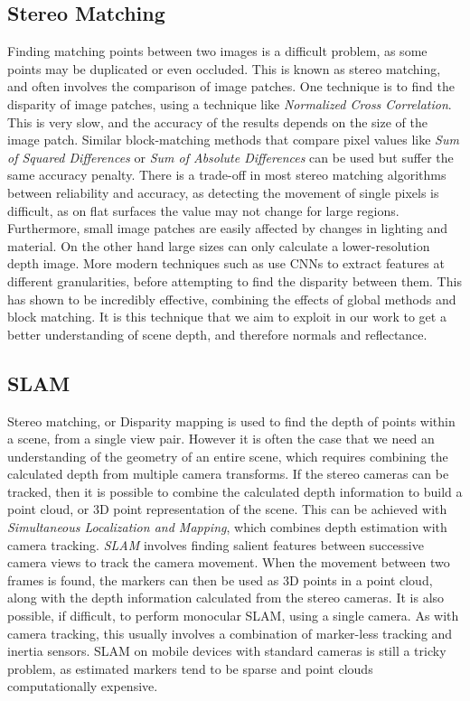 \documentclass[ %
                    author={Gavin Parker},
                supervisor={Dr. Neill Campbell},
                    degree={MEng},
                     title={Deep Learning for Illumination Estimation from Stereo Images},
                  subtitle={},
                      type={Research},
                      year={2018} ]{dissertation}
\begin{document}
\subsection{Stereo Matching}
Finding matching points between two images is a difficult problem, as some points may be duplicated or even occluded. This is known as stereo matching, and often involves the comparison of image patches. One technique is to find the disparity of image patches, using a technique like \textit{Normalized Cross Correlation}. This is very slow, and the accuracy of the results depends on the size of the image patch. Similar block-matching methods that compare pixel values like \textit{Sum of Squared Differences} or \textit{Sum of Absolute Differences} can be used but suffer the same accuracy penalty. There is a trade-off in most stereo matching algorithms between reliability and accuracy, as detecting the movement of single pixels is difficult, as on flat surfaces the value may not change for large regions. Furthermore, small image patches are easily affected by changes in lighting and material. On the other hand large sizes can only calculate a lower-resolution depth image. More modern techniques such as \cite{7780983} use CNNs to extract features at different granularities, before attempting to find the disparity between them. This has shown to be incredibly effective, combining the effects of global methods and block matching. It is this technique that we aim to exploit in our work to get a better understanding of scene depth, and therefore normals and reflectance.
\subsection{SLAM}
Stereo matching, or Disparity mapping is used to find the depth of points within a scene, from a single view pair. However it is often the case that we need an understanding of the geometry of an entire scene, which requires combining the calculated depth from multiple camera transforms. If the stereo cameras can be tracked, then it is possible to combine the calculated depth information to build a point cloud, or 3D point representation of the scene. This can be achieved with \textit{Simultaneous Localization and Mapping}, which combines depth estimation with camera tracking. \textit{SLAM} involves finding salient features between successive camera views to track the camera movement. When the movement between two frames is found, the markers can then be used as 3D points in a point cloud, along with the depth information calculated from the stereo cameras. It is also possible, if difficult, to perform monocular SLAM, using a single camera. As with camera tracking, this usually involves a combination of marker-less tracking and inertia sensors. SLAM on mobile devices with standard cameras is still a tricky problem, as estimated markers tend to be sparse and point clouds computationally expensive.
\end{document}

